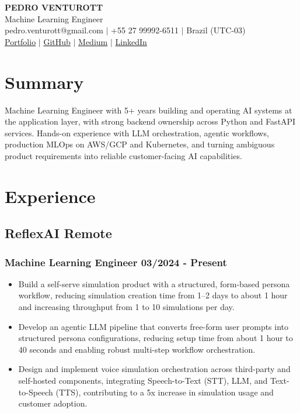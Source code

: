 \documentclass[11pt]{article} %
\begin{document}
\begin{center}
	{\Huge\bfseries PEDRO VENTUROTT} \\ \medskip
	Machine Learning Engineer \\ \medskip
	pedro.venturott@gmail.com $|$ +55 27 99992-6511 $|$ Brazil (UTC-03) \\
	\href{https://pedrohgv.github.io/}{Portfolio} $|$
	\href{https://github.com/Pedrohgv}{GitHub} $|$
	\href{https://pedro-venturott.medium.com/}{Medium} $|$
	\href{https://www.linkedin.com/in/pedro-henrique-gomes-venturott/}{LinkedIn}
\end{center}

\section{Summary}
Machine Learning Engineer with 5+ years building and operating AI systems at the application layer, with strong backend ownership across Python and FastAPI services. Hands-on experience with LLM orchestration, agentic workflows, production MLOps on AWS/GCP and Kubernetes, and turning ambiguous product requirements into reliable customer-facing AI capabilities.

\section{Experience}
\subsection{ReflexAI \hfill Remote}
\subsubsection{Machine Learning Engineer \hfill 03/2024 - Present}
\begin{itemize}
	\item Build a self-serve simulation product with a structured, form-based persona workflow, reducing simulation creation time from 1--2 days to about 1 hour and increasing throughput from 1 to 10 simulations per day.
	\item Develop an agentic LLM pipeline that converts free-form user prompts into structured persona configurations, reducing setup time from about 1 hour to 40 seconds and enabling robust multi-step workflow orchestration.
	\item Design and implement voice simulation orchestration across third-party and self-hosted components, integrating Speech-to-Text (STT), LLM, and Text-to-Speech (TTS), contributing to a 5x increase in simulation usage and customer adoption.
\end{itemize}
\end{document}
